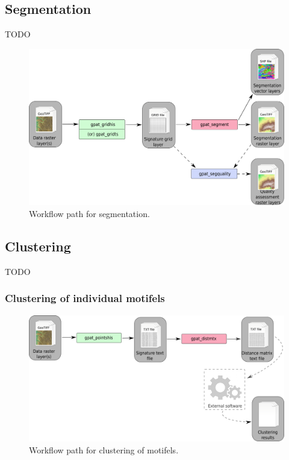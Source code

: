 \documentclass[12pt,margin=0.5in]{article}
\begin{document}
\FloatBarrier

\subsection{Segmentation}
TODO
\begin{figure}[H]
	\centering
	\includegraphics[width=\textwidth]{segment_scheme.png}
	\caption{Workflow path for segmentation.}
	\label{FIG:SEGMENT}
\end{figure}

\FloatBarrier

\subsection{Clustering}
TODO

\subsubsection{Clustering of individual motifels}

\begin{figure}[H]
	\centering
	\includegraphics[width=\textwidth]{cluster_points_scheme.png}
	\caption{Workflow path for clustering of motifels.}
	\label{FIG:CLUSTER_POINTS}
\end{figure}
\end{document}
